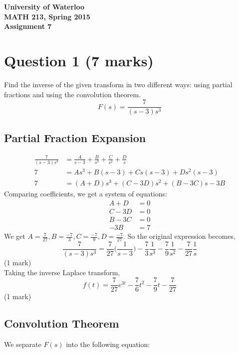 \documentclass[12pt]{article}
\begin{document}
\begin{center}
{\Large\bf University of Waterloo}\\
\vspace{3mm}
{\Large\bf MATH 213, Spring 2015}\\
\vspace{2mm}
{\Large\bf Assignment 7}\\
\end{center}

\section*{Question 1 (7 marks)}
Find the inverse of the given transform in two different ways: using partial fractions and using the convolution theorem. $$F(s) = \frac{7}{(s-3)s^3}$$

\subsection*{Partial Fraction Expansion}
\begin{align*}
  \frac{7}{(s-3)s^3} &= \frac{A}{s-3} + \frac{B}{s^3} + \frac{C}{s^2} + \frac{D}{s} \\
  7 &= As^3 + B(s-3) + Cs(s-3) + Ds^2(s-3) \\
  7 &= (A+D)s^3 + (C-3D)s^2 + (B-3C)s - 3B \tag{1 mark}
\end{align*}
Comparing coefficients, we get a system of equations:
\begin{align*}
  A+D &= 0 \\
  C-3D &= 0 \\
  B-3C &= 0 \\
  -3B &= 7
\end{align*}
We get $A=\frac{7}{27},B=\frac{-7}{3},C=\frac{-7}{9},D=\frac{-7}{27}$. So the original expression becomes, $$\frac{7}{(s-3)s^3}=\frac{7}{27}\bigg(\frac{1}{s-3}\bigg) - \frac{7}{3}\frac{1}{s^3} - \frac{7}{9}\frac{1}{s^2} - \frac{7}{27}\frac{1}{s}$$ \hfill(1 mark) \\ Taking the inverse Laplace transform, $$f(t)=\frac{7}{27}e^{3t} - \frac{7}{6}t^2 - \frac{7}{9}t - \frac{7}{27}$$ \hfill (1 mark)

\subsection*{Convolution Theorem}

We separate $F(s)$ into the following equation:
\end{document}
